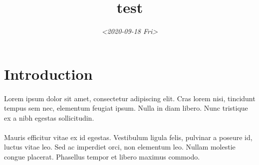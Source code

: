 \documentclass[11pt]{article}
\date{\textit{<2020-09-18 Fri>}}
\title{test}
\begin{document}
\maketitle
\tableofcontents


\section{Introduction}
\label{sec:org847a559}

\paragraph{}
Lorem ipsum dolor sit amet, consectetur adipiscing elit. Cras lorem nisi, tincidunt tempus sem nec,
elementum feugiat ipsum. Nulla in diam libero. Nunc tristique ex a nibh egestas sollicitudin.

\paragraph{}
Mauris efficitur vitae ex id egestas. Vestibulum ligula felis, pulvinar a poseure id, luctus vitae leo.
Sed ac imperdiet orci, non elementum leo. Nullam molestie congue placerat. Phasellus tempor et libero
maximus commodo.
\end{document}
